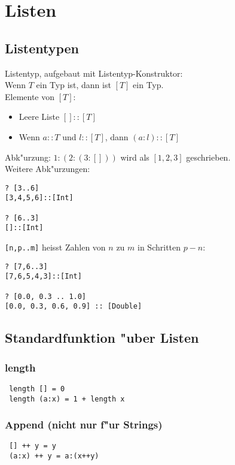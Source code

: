 \documentclass[german,10pt, a4paper, twocolumn]{scrartcl}
\theoremstyle{definition}
\theoremstyle{remark}
\begin{document}
\section{Listen}

\subsection{Listentypen}

Listentyp, aufgebaut mit Listentyp-Konstruktor:\\
Wenn $T$ ein Typ ist, dann ist $[T]$ ein Typ.\\

Elemente von $[T]$:
\begin{itemize}
	\item Leere Liste $[]::[T]$
	\item Wenn $a::T$ und $l::[T]$, dann $(a:l)::[T]$
\end{itemize}

Abk"urzung: $1:(2:(3:[]))$ wird als $[1,2,3]$ geschrieben.\\

Weitere Abk"urzungen:
\begin{verbatim}
? [3..6]
[3,4,5,6]::[Int]

? [6..3]
[]::[Int]
\end{verbatim}

\verb#[n,p..m]# heisst Zahlen von $n$ zu $m$ in Schritten $p-n$:
\begin{verbatim}
? [7,6..3]
[7,6,5,4,3]::[Int]

? [0.0, 0.3 .. 1.0]
[0.0, 0.3, 0.6, 0.9] :: [Double]
\end{verbatim}

\subsection{Standardfunktion "uber Listen}

\subsubsection{length}
\begin{verbatim}
 length [] = 0
 length (a:x) = 1 + length x
\end{verbatim}

\subsubsection{Append (nicht nur f"ur Strings)}
\begin{verbatim}
 [] ++ y = y
 (a:x) ++ y = a:(x++y)
\end{verbatim}
\end{document}
